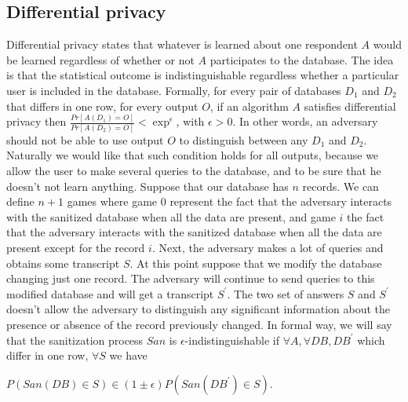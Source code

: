 \subsection{Differential privacy}
Differential privacy states that whatever is learned about one respondent $A$ would be learned regardless of whether or not $A$ participates to the database. The idea is that the statistical outcome is indistinguishable regardless whether a particular user is included in the database. Formally, for every pair of databases $D_{1}$ and $D_{2}$ that differs in one row, for every output $O$, if an algorithm $A$ satisfies differential privacy then $\frac{Pr[A(D_{1}) = O]}{Pr[A(D_{2}) = O]} < \exp^{\epsilon}$, with $\epsilon > 0$. In other words, an adversary should not be able to use output $O$ to distinguish between any $D_{1}$ and $D_{2}$. Naturally we would like that such condition holds for all outputs, because we allow the user to make several queries to the database, and to be sure that he doesn't not learn anything. Suppose that our database has $n$ records. We can define $n + 1$ games where game $0$ represent the fact that the adversary interacts with the sanitized database when all the data are present, and game $i$ the fact that the adversary interacts with the sanitized database when all the data are present except for the record $i$. Next, the adversary makes a lot of queries and obtains some transcript $S$. At this point suppose that we modify the database changing just one record. The adversary will continue to send queries to this modified database and will get a transcript $S^{'}$. The two set of answers $S$ and $S^{'}$ doesn't allow the adversary to distinguish any significant information about the presence or absence of the record previously changed. In formal way, we will say that the sanitization process $San$ is $\epsilon$-indistinguishable if $\forall A, \forall DB, DB^{'}$ which differ in one row, $\forall S$ we have 
\begin{center}
$P(San(DB) \in S) \in (1 \pm \epsilon) P(San(DB^{'}) \in S)$.
\end{center}
